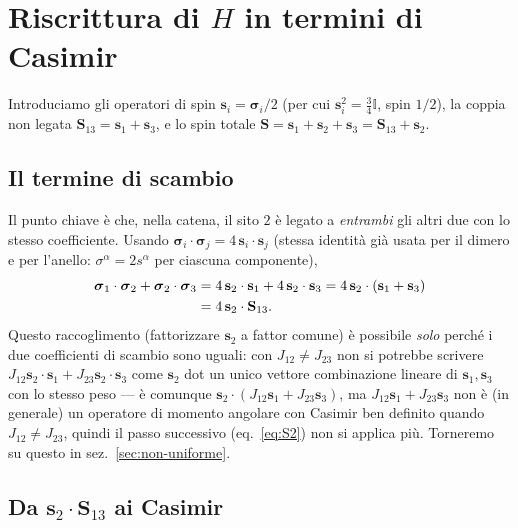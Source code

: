 \documentclass[11pt,a4paper]{article}
\begin{document}
\section{Riscrittura di $H$ in termini di Casimir}
\label{sec:kambe}

Introduciamo gli operatori di spin $\mathbf s_i=\boldsymbol\sigma_i/2$ (per cui
$\mathbf s_i^2=\tfrac34\mathbb{I}$, spin $1/2$), la coppia non legata
$\mathbf S_{13}=\mathbf s_1+\mathbf s_3$, e lo spin totale
$\mathbf S=\mathbf s_1+\mathbf s_2+\mathbf s_3=\mathbf S_{13}+\mathbf s_2$.

\subsection{Il termine di scambio}

Il punto chiave è che, nella catena, il sito $2$ è legato a \emph{entrambi}
gli altri due con lo stesso coefficiente. Usando $\boldsymbol\sigma_i\cdot\boldsymbol\sigma_j=4\,\mathbf
s_i\cdot\mathbf s_j$ (stessa identità già usata per il dimero e per
l'anello: $\sigma^\alpha=2s^\alpha$ per ciascuna componente),
\begin{align}
\boldsymbol\sigma_1\cdot\boldsymbol\sigma_2+\boldsymbol\sigma_2\cdot\boldsymbol\sigma_3
&= 4\,\mathbf s_2\cdot\mathbf s_1 + 4\,\mathbf s_2\cdot\mathbf s_3
= 4\,\mathbf s_2\cdot(\mathbf s_1+\mathbf s_3)\notag\\
&= 4\,\mathbf s_2\cdot\mathbf S_{13}.
\label{eq:raccolta}
\end{align}
Questo raccoglimento (fattorizzare $\mathbf s_2$ a fattor comune) è possibile
\emph{solo} perché i due coefficienti di scambio sono uguali: con
$J_{12}\neq J_{23}$ non si potrebbe scrivere $J_{12}\mathbf s_2\!\cdot\!\mathbf
s_1+J_{23}\mathbf s_2\!\cdot\!\mathbf s_3$ come $\mathbf s_2$ dot un unico vettore
combinazione lineare di $\mathbf s_1,\mathbf s_3$ con lo stesso peso — è
comunque $\mathbf s_2\cdot(J_{12}\mathbf s_1+J_{23}\mathbf s_3)$, ma
$J_{12}\mathbf s_1+J_{23}\mathbf s_3$ non è (in generale) un operatore di
momento angolare con Casimir ben definito quando $J_{12}\ne J_{23}$, quindi
il passo successivo (eq.~\ref{eq:S2}) non si applica più. Torneremo su
questo in sez.~\ref{sec:non-uniforme}.

\subsection{Da $\mathbf s_2\cdot\mathbf S_{13}$ ai Casimir}
\end{document}
